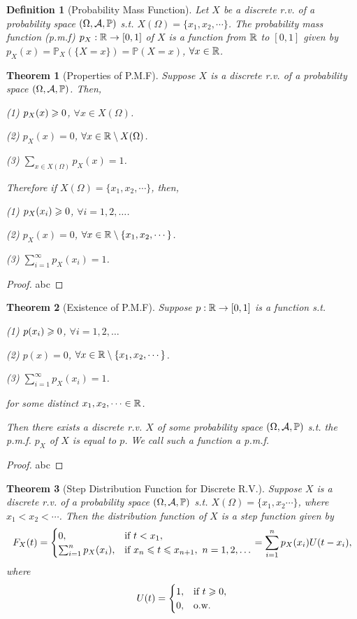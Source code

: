 \documentclass[openany,12pt]{book}
\newtheorem{theorem}{Theorem}[chapter]
\newtheorem{definition}{Definition}[chapter]
\begin{document}
\begin{definition}[Probability Mass Function]
  Let $X$ be a discrete r.v. of a probability space $(\Omega,\mathcal{A},\mathbb{P})$ s.t. $X(\Omega)=\{x_1,x_2,\cdots\}$. The probability mass function (p.m.f) $p_X: \mathbb{R}\to[0,1]$ of $X$ is a function from $\mathbb{R}$ to $[0,1]$ given by $p_X(x)=\mathbb{P}_X(\{X=x\})=\mathbb{P}(X=x)$, $\forall x\in\mathbb{R}$.
\end{definition}

\begin{theorem}[Properties of P.M.F]
  Suppose $X$ is a discrete r.v. of a probability space $(\Omega,\mathcal{A},\mathbb{P})$. Then,

  (1) $p_X(x)\geqslant0$, $\forall x\in X(\Omega)$.

  (2) $p_X(x)=0$, $\forall x\in\mathbb{R}\setminus X(\Omega)$.

  (3) $\sum_{x\in X(\Omega)}p_X(x)=1$.

  Therefore if $X(\Omega)=\{x_1,x_2,\cdots\}$, then,

  (1) $p_X(x_i)\geqslant0$, $\forall i=1,2,\dots$.

  (2) $p_X(x)=0$, $\forall x\in\mathbb{R}\setminus\{x_1,x_2,\cdots\}$.

  (3) $\sum_{i=1}^\infty p_X(x_i)=1$.
\end{theorem}

\begin{proof}
  abc
\end{proof}

\begin{theorem}[Existence of P.M.F]
  Suppose $p:\mathbb{R}\to[0,1]$ is a function s.t.

  (1) $p(x_i)\geqslant0$, $\forall i=1,2,\dots$

  (2) $p(x)=0$, $\forall x\in\mathbb{R}\setminus\{x_1,x_2,\cdots\}$.

  (3) $\sum_{i=1}^\infty p_X(x_i)=1$.

  for some distinct $x_1,x_2,\cdots\in\mathbb{R}$.

  Then there exists a discrete r.v. $X$ of some probability space $(\Omega,\mathcal{A},\mathbb{P})$ s.t. the p.m.f. $p_X$ of $X$ is equal to $p$. We call such a function a p.m.f.
\end{theorem}

\begin{proof}
  abc
\end{proof}

\begin{theorem}[Step Distribution Function for Discrete R.V.]
  Suppose $X$ is a discrete r.v. of a probability space $(\Omega,\mathcal{A},\mathbb{P})$ s.t. $X(\Omega)=\{x_1,x_2\cdots\}$, where $x_1<x_2<\cdots$. Then the distribution function of $X$ is a step function given by
  $$
    F_X(t)=
    \begin{cases}
      0, &\text{if}~t<x_1, \\
      \sum_{i=1}^{n} p_X(x_i), &\text{if}~x_n\leqslant t\leqslant x_{n+1},~n=1,2,\dots
    \end{cases}
    =\sum_{i=1}^{n} p_X(x_i)U(t-x_i),
  $$
  where
  $$
    U(t)=\begin{cases}
      1, &\text{if}~t\geqslant0, \\
      0, &\text{o.w.}
    \end{cases}
  $$
\end{theorem}
\end{document}
